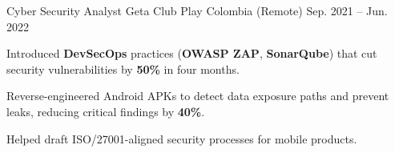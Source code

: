 \begin{cventries}
  \cventry
  {Cyber Security Analyst}
  {Geta Club Play}
  {Colombia (Remote)}
  {Sep. 2021 -- Jun. 2022}
  {
    \begin{cvitems}
      \item {Introduced \textbf{DevSecOps} practices (\textbf{OWASP ZAP}, \textbf{SonarQube}) that cut security vulnerabilities by \textbf{50\%} in four months.}
      \item {Reverse-engineered Android APKs to detect data exposure paths and prevent leaks, reducing critical findings by \textbf{40\%}.}
      \item {Helped draft ISO/27001-aligned security processes for mobile products.}
    \end{cvitems}
  }

\end{cventries}
